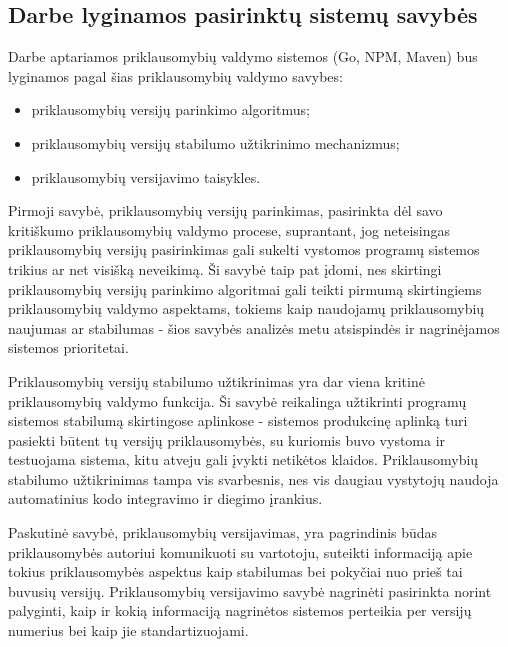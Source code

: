 \subsection{Darbe lyginamos pasirinktų sistemų savybės}

Darbe aptariamos priklausomybių valdymo sistemos (Go, NPM, Maven) bus lyginamos pagal šias priklausomybių valdymo savybes:
\begin{itemize}
    \item priklausomybių versijų parinkimo algoritmus;
    \item priklausomybių versijų stabilumo užtikrinimo mechanizmus;
    \item priklausomybių versijavimo taisykles.
\end{itemize}

Pirmoji savybė, priklausomybių versijų parinkimas, pasirinkta dėl savo kritiškumo priklausomybių valdymo procese, suprantant, jog neteisingas priklausomybių versijų pasirinkimas gali sukelti vystomos programų sistemos trikius ar net visišką neveikimą. Ši savybė taip pat įdomi, nes skirtingi priklausomybių versijų parinkimo algoritmai gali teikti pirmumą skirtingiems priklausomybių valdymo aspektams, tokiems kaip naudojamų priklausomybių naujumas ar stabilumas - šios savybės analizės metu atsispindės ir nagrinėjamos sistemos prioritetai.

Priklausomybių versijų stabilumo užtikrinimas yra dar viena kritinė priklausomybių valdymo funkcija. Ši savybė reikalinga užtikrinti programų sistemos stabilumą skirtingose aplinkose - sistemos produkcinę aplinką turi pasiekti būtent tų versijų priklausomybės, su kuriomis buvo vystoma ir testuojama sistema, kitu atveju gali įvykti netikėtos klaidos. Priklausomybių stabilumo užtikrinimas tampa vis svarbesnis, nes vis daugiau vystytojų naudoja automatinius kodo integravimo ir diegimo įrankius.

Paskutinė savybė, priklausomybių versijavimas, yra pagrindinis būdas priklausomybės autoriui komunikuoti su vartotoju, suteikti informaciją apie tokius priklausomybės aspektus kaip stabilumas bei pokyčiai nuo prieš tai buvusių versijų. Priklausomybių versijavimo savybė nagrinėti pasirinkta norint palyginti, kaip ir kokią informaciją nagrinėtos sistemos perteikia per versijų numerius bei kaip jie standartizuojami.


